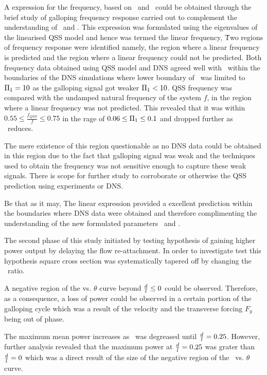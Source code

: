 A expression for the frequency, based on \massstiff\ and \massdamp\ could be obtained through the brief study of galloping frequency response carried out to complement the understanding of \massstiff\ and \massdamp. This expression was formulated using the eigenvalues of the linearised QSS model and hence was termed the linear frequency,  \freqlin\. Two regions of frequency response were identified namely, the region where a linear frequency is predicted and the region where a linear frequency could not be predicted. Both frequency data obtained using QSS model and DNS agreed well with \freqlin\ within the boundaries of the DNS simulations where lower boundary of \massstiff\ was limited to $\Pi_1=10$ as the galloping signal got weaker $\Pi_1<10$. 
QSS frequency was compared with the undamped natural frequency of the system $f$, in the region where a linear frequency was not predicted. This revealed that it was within $0.55\leq\frac{f_{QSS}}{f}\leq0.75$ in the rage of $0.06\leq\Pi_1\leq0.1$ and dropped further as \massstiff\ reduces.  

The mere existence of this region questionable as no DNS data could be obtained in this region due to the fact that galloping signal was weak and the techniques used to obtain the  frequency was not sensitive enough to capture these weak signals. There is scope for further study to corroborate or otherwise the QSS prediction using experiments or DNS. 

Be that as it may, The linear expression provided a excellent prediction within the boundaries where DNS data were obtained and therefore complimenting the understanding of the new formulated parameters \massstiff\ and \massdamp. 


The second phase of this study initiated by testing  hypothesis of gaining higher power output by delaying the flow re-attachment. In order to investigate test this hypothesis square cross section was systematically tapered off by changing the \ratio\ ratio.

A negative region of the \cy vs. $\theta$ curve beyond $\frac{d}{l}\leq0$ could be observed. Therefore, as a consequence, a loss of power could be observed in a certain portion of the galloping cycle which was a result of the velocity and the transverse forcing $F_{y}$ being out of phase. 

The maximum mean power increases as \ratio\ was degreased until $\frac{d}{l}=0.25$. However, further analysis revealed that the maximum power at $\frac{d}{l}=0.25$ was grater than $\frac{d}{l}=0$ which was a direct result of the size of the negative region of the \cy\ vs. $\theta$ curve.


